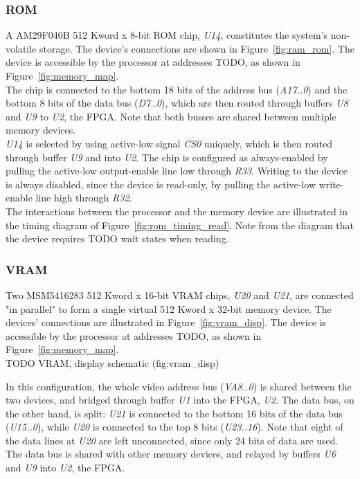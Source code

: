 \documentclass{scrartcl}
\begin{document}
	\subsubsection{ROM}
	A AM29F040B 512 Kword x 8-bit ROM chip, \textit{U14}, constitutes the system's non-volatile storage. The device's connections are shown in Figure~\ref{fig:ram_rom}. The device is accessible by the processor at addresses TODO, as shown in Figure~\ref{fig:memory_map}.\\

	The chip is connected to the bottom 18 bits of the address bus (\textit{A17..0}) and the bottom 8 bits of the data bus (\textit{D7..0}), which are then routed through buffers \textit{U8} and \textit{U9} to \textit{U2}, the FPGA. Note that both busses are shared between multiple memory devices.\\

	\textit{U14} is selected by using active-low signal \textit{CS0} uniquely, which is then routed through buffer \textit{U9} and into \textit{U2}. The chip is configured as always-enabled by pulling the active-low output-enable line low through \textit{R33}. Writing to the device is always disabled, since the device is read-only, by pulling the active-low write-enable line high through \textit{R32}.\\

	The interactions between the processor and the memory device are illustrated in the timing diagram of Figure~\ref{fig:rom_timing_read}. Note from the diagram that the device requires TODO wait states when reading.\\
	
	\subsubsection{VRAM}
	Two MSM5416283 512 Kword x 16-bit VRAM chips, \textit{U20} and \textit{U21}, are connected "in parallel" to form a single virtual 512 Kword x 32-bit memory device. The devices' connections are illustrated in Figure~\ref{fig:vram_disp}. The device is accessible by the processor at addresses TODO, as shown in Figure~\ref{fig:memory_map}.\\

	TODO VRAM, display schematic (fig:vram_disp)

	 In this configuration, the whole video address bus (\textit{VA8..0}) is shared between the two devices, and bridged through buffer \textit{U1} into the FPGA, \textit{U2}. The data bus, on the other hand, is split: \textit{U21} is connected to the bottom 16 bits of the data bus (\textit{U15..0}), while \textit{U20} is connected to the top 8 bits (\textit{U23..16}). Note that eight of the data lines at \textit{U20} are left unconnected, since only 24 bits of data are used. The data bus is shared with other memory devices, and relayed by buffers \textit{U6} and \textit{U9} into \textit{U2}, the FPGA.\\
\end{document}
